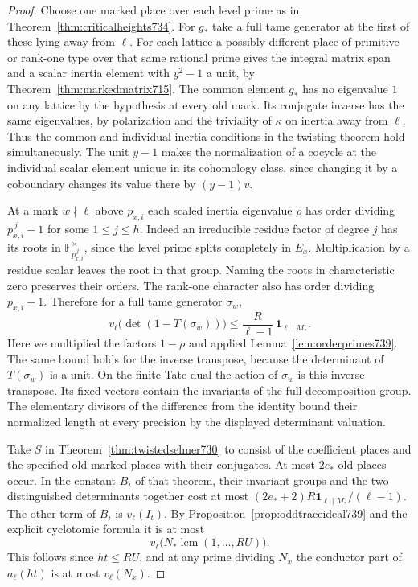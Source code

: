 \documentclass[a4paper,11pt]{article}
\theoremstyle{definition}
\theoremstyle{remark}
\numberwithin{equation}{section}
\begin{document}
\begin{proof}
Choose one marked place over each level prime as in
Theorem~\ref{thm:criticalheights734}. For \(g_*\) take a full tame
generator at the first of these lying away from \(\ell\). For each
lattice a possibly different place of primitive or rank-one type
over that same rational prime gives the integral matrix span and a
scalar inertia element with \(y^2-1\) a unit, by
Theorem~\ref{thm:markedmatrix715}. The common element \(g_*\)
has no eigenvalue \(1\) on any lattice by the hypothesis at
every old mark. Its conjugate inverse has the same eigenvalues,
by polarization and the triviality of \(\kappa\) on inertia
away from \(\ell\). Thus the common and individual inertia
conditions in the twisting theorem hold simultaneously. The
unit \(y-1\) makes the normalization of a cocycle at the
individual scalar element unique in its cohomology class,
since changing it by a coboundary changes its value there
by \((y-1)v\).

At a mark \(w\nmid\ell\) above \(p_{x,i}\) each scaled inertia
eigenvalue \(\rho\) has order dividing \(p_{x,i}^{\,j}-1\)
for some \(1\le j\le h\). Indeed an irreducible residue
factor of degree \(j\) has its roots in
\(\mathbb F_{p_{x,i}^{\,j}}^\times\), since the level prime splits
completely in \(E_x\). Multiplication by a residue scalar leaves
the root in that group. Naming the roots in characteristic zero
preserves their orders. The rank-one character also has order
dividing \(p_{x,i}-1\). Therefore for a full tame generator
\(\sigma_w\),
\[
 v_\ell\bigl(\det(1-T(\sigma_w))\bigr)
             \le \frac{R}{\ell-1}\,\mathbf1_{\ell\mid M_*}.
\]
Here we multiplied the factors \(1-\rho\) and applied
Lemma~\ref{lem:orderprimes739}. The same bound holds for the
inverse transpose, because the determinant of \(T(\sigma_w)\)
is a unit. On the finite Tate dual the action of \(\sigma_w\)
is this inverse transpose. Its fixed vectors contain the
invariants of the full decomposition group. The elementary
divisors of the difference from the identity bound their
normalized length at every precision by the displayed
determinant valuation.

Take \(S\) in Theorem~\ref{thm:twistedselmer730} to consist
of the coefficient places and the specified old marked places
with their conjugates. At most \(2e_*\) old places occur.
In the constant \(B_i\) of that theorem, their invariant
groups and the two distinguished determinants together cost
at most \((2e_*+2)R\mathbf1_{\ell\mid M_*}/(\ell-1)\). The
other term of \(B_i\) is \(v_\ell(I_t)\). By
Proposition~\ref{prop:oddtraceideal739} and the explicit
cyclotomic formula it is at most
\[
        v_\ell\!\big(N_*\operatorname{lcm}(1,\ldots,RU)\big).
\]
This follows since \(ht\le RU\), and at any prime dividing
\(N_x\) the conductor part of \(a_\ell(ht)\) is at most
\(v_\ell(N_x)\).


\end{proof}
\end{document}
